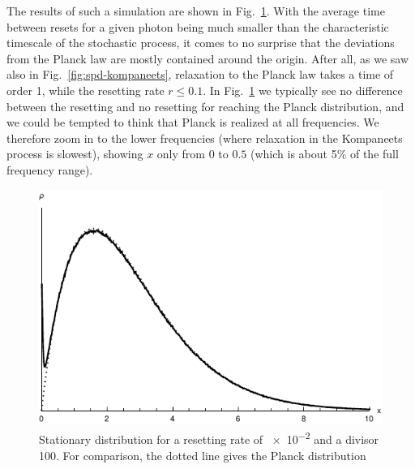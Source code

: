 \documentclass[a4paper,12pt,reqno,superscriptaddress,nofootinbib]{revtex4}
\theoremstyle{plain}
\theoremstyle{definition}
\theoremstyle{remark}
\newcommand{\0}{^{(0)}}
\newcommand{\1}{^{(1)}}
\newcommand{\2}{^{(2)}}
\begin{document}
The results of such a simulation are shown in Fig.~\ref{fig:fullplanck}. With the average time between resets for a given photon being much smaller than the characteristic timescale of the stochastic process, it comes to no surprise that the deviations from the Planck law are mostly contained around the origin. After all, as we saw also in Fig.~\ref{fig:spd-kompaneets}, relaxation to the Planck law takes a time of order 1, while the resetting rate $r\leq 0.1$. In Fig.~\ref{fig:fullplanck} we typically see no difference between the resetting and no resetting for reaching the Planck distribution, and we could be tempted to think that Planck is realized at all frequencies. We therefore zoom in to the lower frequencies (where relaxation in the Kompaneets process is slowest), showing $x$ only from $0$ to $0.5$ (which is about 5\% of the full frequency range).\\

\begin{figure}
	\includegraphics{fullplanck.pdf}
	\caption{Stationary distribution for a resetting rate of \num{e-2} and a divisor \num{100}. For comparison, the dotted line gives the Planck distribution}\label{fig:fullplanck}
\end{figure}
\end{document}
